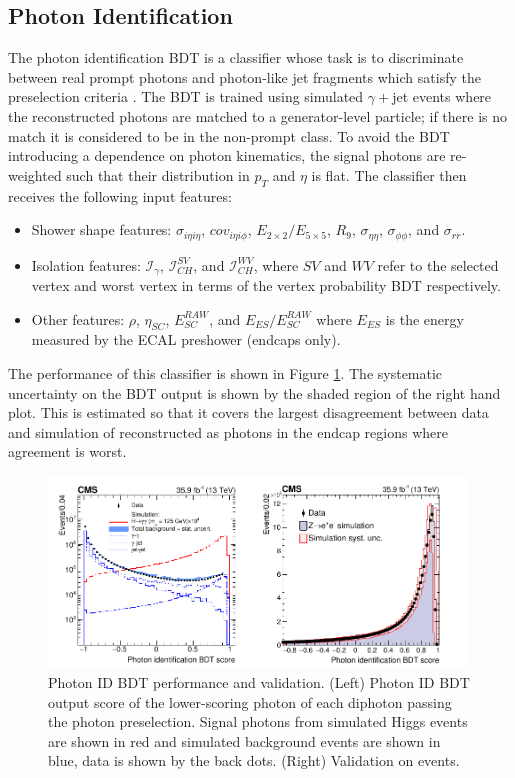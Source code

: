 \subsection{Photon Identification}
The photon identification BDT is a classifier whose task is to discriminate between real prompt photons and photon-like jet fragments which satisfy the preselection criteria \cite{PhotonReco}. 
The BDT is trained using simulated $\gamma + $jet events where the reconstructed photons are matched to a generator-level particle; if there is no match it is considered to be in the non-prompt class.
To avoid the BDT introducing a dependence on photon kinematics, the signal photons are re-weighted such that their distribution in $p_{T}$ and $\eta$ is flat. 
The classifier then receives the following input features:
\begin{itemize}[noitemsep]
    \item Shower shape features: $\sigma_{i\eta{}i\eta}$, $cov_{i\eta{}i\phi}$, $E_{2\times{}2}/E_{5\times{}5}$, $R_{9}$, $\sigma_{\eta\eta}$, $\sigma_{\phi\phi}$, and $\sigma_{rr}$.
    \item Isolation features: $\mathcal{I}_{\gamma}$, $\mathcal{I}_{CH}^{SV}$, and $\mathcal{I}_{CH}^{WV}$, where $SV$ and $WV$ refer to the selected vertex and worst vertex in terms of the vertex probability BDT respectively. 
    \item Other features: $\rho$, $\eta_{SC}$, $E_{SC}^{RAW}$, and $E_{ES}/E_{SC}^{RAW}$ where $E_{ES}$ is the energy measured by the ECAL preshower (endcaps only).
\end{itemize}

The performance of this classifier is shown in Figure \ref{fig:object_reco:photon_id_bdt}. 
The systematic uncertainty on the BDT output is shown by the shaded region of the right hand plot. This is estimated so that it covers the largest disagreement between data and simulation of \Zee reconstructed as photons in the endcap regions where agreement is worst.
\begin{figure}[h!]
    \centering
    \includegraphics[width=0.99\textwidth]{figures/object_reco/CMS-HIG-16-040_Figure_002.pdf}
    \caption{Photon ID BDT performance and validation. (Left) Photon ID BDT output score of the lower-scoring photon of each diphoton passing the photon preselection. Signal photons from simulated Higgs events are shown in red and simulated background events are shown in blue, data is shown by the back dots. (Right) Validation on \Zee events.}
        \label{fig:object_reco:photon_id_bdt}
\end{figure}

